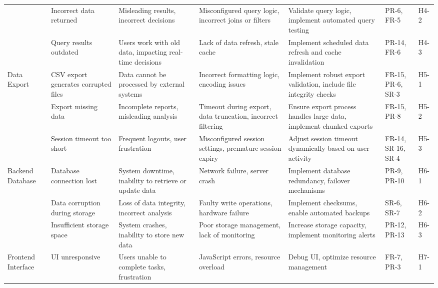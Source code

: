 \documentclass{article}
\begin{document}
\begin{landscape}
\begin{longtable}{|p{2.5cm}|p{4cm}|p{4cm}|p{4cm}|p{4cm}|p{1.25cm}|p{1cm}|}
      \cline{2-7}
      \texttt{} & Incorrect data returned & Misleading results, incorrect
      decisions & Misconfigured query logic, incorrect joins or filters &
      Validate query logic, implement automated query testing & PR-6, FR-5 &
      H4-2 \\
      \cline{2-7}
      \texttt{} & Query results outdated & Users work with old data, impacting
      real-time decisions & Lack of data refresh, stale cache & Implement
      scheduled data refresh and cache invalidation & PR-14, FR-6 & H4-3 \\
      \cline{1-7}
      Data Export & CSV export generates corrupted files & Data cannot be
      processed by external systems & Incorrect formatting logic, encoding
      issues & Implement robust export validation, include file integrity checks
      & FR-15, PR-6, SR-3 & H5-1 \\
      \cline{2-7}
      \texttt{} & Export missing data & Incomplete reports, misleading analysis
      & Timeout during export, data truncation, incorrect filtering & Ensure
      export process handles large data, implement chunked exports & FR-15, PR-8
      & H5-2 \\
      \cline{2-7}
      \texttt{} & Session timeout too short & Frequent logouts, user frustration
      & Misconfigured session settings, premature session expiry & Adjust
      session timeout dynamically based on user activity & FR-14, SR-16, SR-4 &
      H5-3 \\
      \cline{1-7}
      Backend Database & Database connection lost & System downtime, inability
      to retrieve or update data & Network failure, server crash & Implement
      database redundancy, failover mechanisms & PR-9, PR-10 & H6-1 \\
      \cline{2-7}
      \texttt{} & Data corruption during storage & Loss of data integrity,
      incorrect analysis & Faulty write operations, hardware failure & Implement
      checksums, enable automated backups & SR-6, SR-7 & H6-2 \\
      \cline{2-7}
      \texttt{} & Insufficient storage space & System crashes, inability to
      store new data & Poor storage management, lack of monitoring & Increase
      storage capacity, implement monitoring alerts & PR-12, PR-13 & H6-3 \\
      \cline{1-7}
      Frontend Interface & UI unresponsive & Users unable to complete tasks,
      frustration & JavaScript errors, resource overload & Debug UI, optimize
      resource management & FR-7, PR-3 & H7-1 \\

\end{longtable}
\end{landscape}
\end{document}

